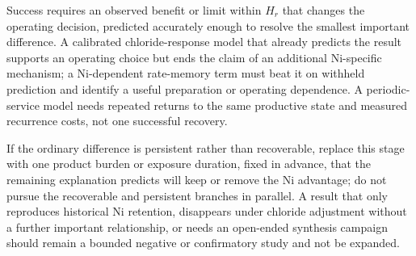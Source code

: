 Success requires an observed benefit or limit within $H_r$ that changes the operating decision, predicted accurately enough to resolve the smallest important difference. A calibrated chloride-response model that already predicts the result supports an operating choice but ends the claim of an additional Ni-specific mechanism; a Ni-dependent rate-memory term must beat it on withheld prediction and identify a useful preparation or operating dependence. A periodic-service model needs repeated returns to the same productive state and measured recurrence costs, not one successful recovery.

If the ordinary difference is persistent rather than recoverable, replace this stage with one product burden or exposure duration, fixed in advance, that the remaining explanation predicts will keep or remove the Ni advantage; do not pursue the recoverable and persistent branches in parallel. A result that only reproduces historical Ni retention, disappears under chloride adjustment without a further important relationship, or needs an open-ended synthesis campaign should remain a bounded negative or confirmatory study and not be expanded.
